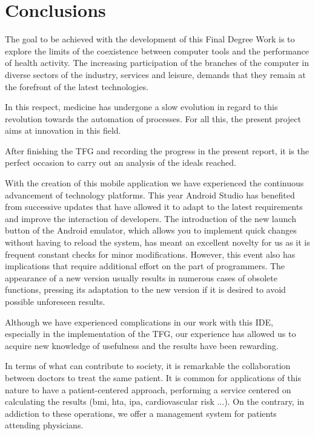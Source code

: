 \documentclass[11pt,spanish,
		listoftables,listoffigures]
		{tfgplantilla}
\begin{document}
\addtocounter{chapter}{-1}
\chapter{Conclusions}

The goal to be achieved with the development of this Final Degree Work is to explore the limits of the coexistence between computer tools and the performance of health activity. The increasing participation of the branches of the computer in diverse sectors of the industry, services and leisure, demands that they remain at the forefront of the latest technologies.

In this respect, medicine has undergone a slow evolution in regard to this revolution towards the automation of processes. For all this, the present project aims at innovation in this field.

After finishing the TFG and recording the progress in the present report, it is the perfect occasion to carry out an analysis of the ideals reached.

With the creation of this mobile application we have experienced the continuous advancement of technology platforms. This year Android Studio has benefited from successive updates that have allowed it to adapt to the latest requirements and improve the interaction of developers. The introduction of the new launch button of the Android emulator, which allows you to implement quick changes without having to reload the system, has meant an excellent novelty for us as it is frequent constant checks for minor modifications. However, this event also has implications that require additional effort on the part of programmers. The appearance of a new version usually results in numerous cases of obsolete functions, pressing its adaptation to the new version if it is desired to avoid possible unforeseen results.

Although we have experienced complications in our work with this IDE, especially in the implementation of the TFG, our experience has allowed us to acquire new knowledge of usefulness and the results have been rewarding.

In terms of what can contribute to society, it is remarkable the collaboration between doctors to treat the same patient. It is common for applications of this nature to have a patient-centered approach, performing a service centered on calculating the results (bmi, hta, ipa, cardiovascular risk ...). On the contrary, in addiction to these operations, we offer a management system for patients attending physicians.
\end{document}
